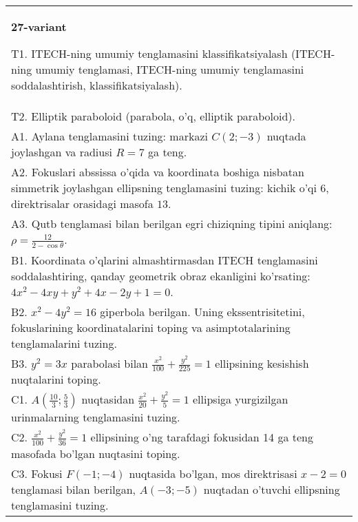 \documentclass{article}
\begin{document}
\begin{tabular}{m{17cm}}
\textbf{27-variant}
\newline

T1. ITECH-ning umumiy tenglamasini klassifikatsiyalash (ITECH-ning umumiy tenglamasi, ITECH-ning umumiy tenglamasini soddalashtirish, klassifikatsiyalash).\\

T2. Elliptik paraboloid (parabola, o'q, elliptik paraboloid).\\

A1. Aylana tenglamasini tuzing: markazi $C(2;-3)$ nuqtada joylashgan va radiusi $R=7$ ga teng.\\

A2. Fokuslari abssissa o'qida va koordinata boshiga nisbatan simmetrik joylashgan ellipsning tenglamasini tuzing: kichik o'qi $6$, direktrisalar orasidagi masofa $13$.\\

A3. Qutb tenglamasi bilan berilgan egri chiziqning tipini aniqlang: $\rho=\frac{12}{2-\cos\theta}$.\\

B1. Koordinata o'qlarini almashtirmasdan ITECH tenglamasini soddalashtiring, qanday geometrik obraz ekanligini ko'rsating: $4x^{2} - 4xy + y^{2} + 4x - 2y + 1 = 0$.  \\

B2. $x^{2} - 4y^{2} = 16$ giperbola berilgan. Uning ekssentrisitetini, fokuslarining koordinatalarini toping va asimptotalarining tenglamalarini tuzing.\\

B3. $y^{2} = 3x$ parabolasi bilan $\frac{x^{2}}{100} + \frac{y^{2}}{225} = 1$ ellipsining kesishish nuqtalarini toping.  \\

C1. $A(\frac{10}{3};\frac{5}{3})$ nuqtasidan $\frac{x^{2}}{20} + \frac{y^{2}}{5} = 1$ ellipsiga yurgizilgan urinmalarning tenglamasini tuzing.  \\

C2. $\frac{x^{2}}{100} + \frac{y^{2}}{36} = 1$ ellipsining o'ng tarafdagi fokusidan 14 ga teng masofada bo'lgan nuqtasini toping.  \\

C3. Fokusi $F( - 1; - 4)$ nuqtasida bo'lgan, mos direktrisasi $x - 2 = 0$ tenglamasi bilan berilgan, $A( - 3; - 5)$ nuqtadan o'tuvchi ellipsning tenglamasini tuzing.  \\

\end{tabular}
\vspace{1cm}
\end{document}
